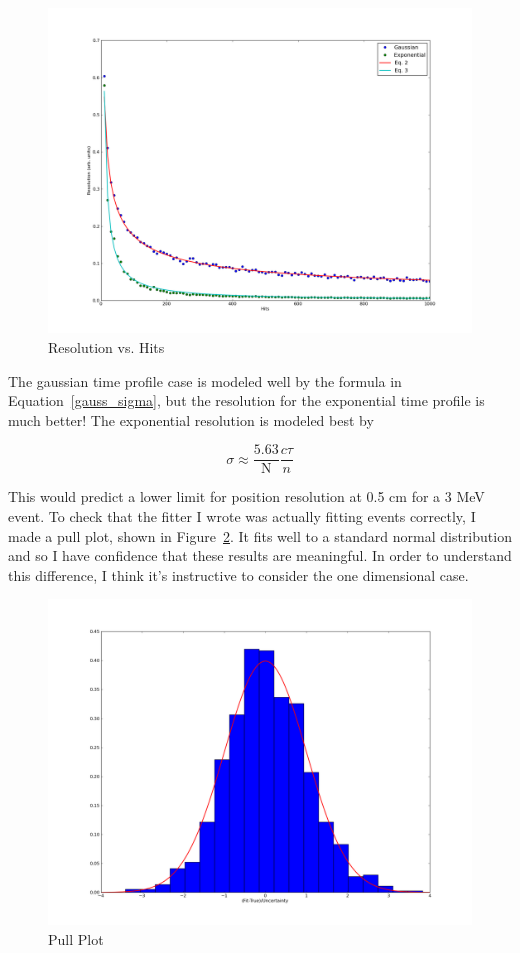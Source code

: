 \documentclass{article}
\newcommand{\N}{\mathrm{N}}
\begin{document}
\begin{figure}[h!]
    \centering
    \includegraphics[width=0.85\linewidth]{gauss_exp2.png}
    \caption{Resolution vs. Hits}
    \label{res_n}
\end{figure}

The gaussian time profile case is modeled well by the formula in
Equation~\ref{gauss_sigma}, but the resolution for the exponential time profile
is much better! The exponential resolution is modeled best by

\begin{equation}
    \sigma \approx \frac{5.63}{\N} \frac{c \tau}{n}
\end{equation}

This would predict a lower limit for position resolution at 0.5 cm for a 3 MeV
event. To check that the fitter I wrote was actually fitting events correctly,
I made a pull plot, shown in Figure~\ref{pull_plot}. It fits well to a standard
normal distribution and so I have confidence that these results are meaningful.
In order to understand this difference, I think it's instructive to consider
the one dimensional case.

\begin{figure}[h!]
    \centering
    \includegraphics[width=0.85\linewidth]{pull_plot.png}
    \caption{Pull Plot}
    \label{pull_plot}
\end{figure}
\end{document}
